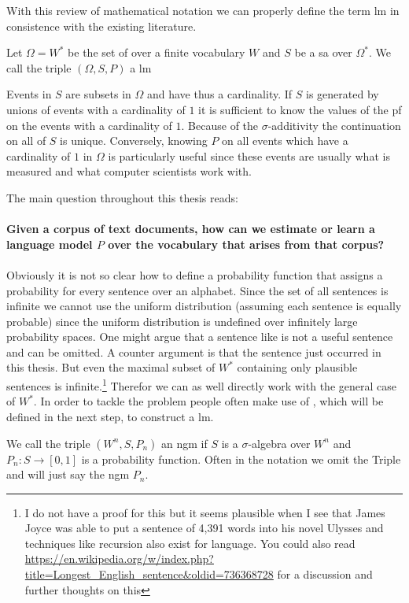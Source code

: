 \documentclass[•]{book}
\begin{document}
With this review of mathematical notation we can properly define the term \gls{lm} in consistence with the existing literature.

\begin{definition}\label{def:lm}
Let $\Omega = W^{*}$ be the set of  over a finite vocabulary $W$ and $S$ be a \gls{sa} over $\Omega^{*}$.
We call the triple $(\Omega, S, P)$ a \gls{lm}
\end{definition} 

\begin{example}\label{ex:continuation}
Events in $S$ are subsets in $\Omega$ and have thus a cardinality.
If $S$ is generated by unions of events with a cardinality of $1$ it is sufficient to know the values of the \gls{pf} on the events with a cardinality of $1$. Because of the $\sigma$-additivity the continuation on all of $S$ is unique.  
Conversely, knowing $P$ on all events which have a cardinality of $1$ in $\Omega$ is particularly useful since these events are usually what is measured and what computer scientists work with.
\end{example}

The main question throughout this thesis reads:\\
\\
\textbf{Given a corpus of text documents, how can we estimate or learn a language model $P$ over the vocabulary that arises from that corpus?} 
\\
\\
Obviously it is not so clear how to define a probability function that assigns a probability for every sentence over an alphabet. 
Since the set of all sentences is infinite we cannot use the uniform distribution (assuming each sentence is equally probable) since the uniform distribution is undefined over infinitely large probability spaces.  
One might argue that a sentence like  is not a useful sentence and can be omitted. 
A counter argument is that the sentence just occurred in this thesis. 
But even the maximal subset of $W^{*}$ containing only plausible sentences is infinite.\footnote{I do not have a proof for this but it seems plausible when I see that James Joyce was able to put a sentence of 4,391 words into his novel Ulysses and techniques like recursion also exist for language. You could also read \url{https://en.wikipedia.org/w/index.php?title=Longest_English_sentence&oldid=736368728} for a discussion and further thoughts on this}
Therefor we can as well directly work with the general case of $W^{*}$.
In order to tackle the problem people often make use of , which will be defined in the next step, to construct a \gls{lm}.  
\begin{definition}We call the triple $(W^{n}, S, P_n)$ an \gls{ngm} if $S$ is a $\sigma$-algebra over $W^{n}$ and $P_n:S\longrightarrow [0,1]$ is a probability function. Often in the notation we omit the Triple and will just say the \gls{ngm} $P_n$. 
\end{definition}
\end{document}
